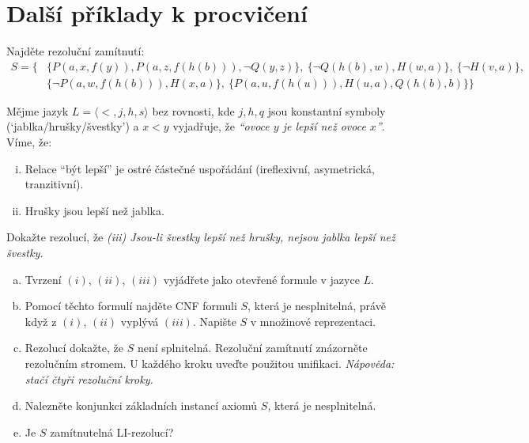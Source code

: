         
\section*{Další příklady k procvičení}


\begin{problem}
    Najděte rezoluční zamítnutí: 
    \begin{align*}
        S=\{
            &\{P(a,x,f(y)),P(a,z,f(h(b))),\neg Q(y,z)\},\
            \{\neg Q(h(b),w),H(w,a)\},\ 
            \{\neg H(v,a)\},\\
            &\{\neg P(a,w,f(h(b))),H(x,a)\},\
            \{P(a,u,f(h(u))),H(u,a),Q(h(b),b)\}            
        \}
    \end{align*}
   

\end{problem}


\begin{problem}

    Mějme jazyk $L=\langle <, j, h, s\rangle$ bez rovnosti, kde $j,h,q$ jsou konstantní symboly (`jablka/hrušky/švestky') a $x < y$ vyjadřuje, že {\it ``ovoce $y$ je lepší než ovoce $x$''}. Víme, že:
    \begin{enumerate}[(i)]\it
        \item Relace ``být lepší'' je ostré částečné uspořádání (ireflexivní, asymetrická, tranzitivní).
        \item Hrušky jsou lepší než jablka.
    \end{enumerate}
    Dokažte rezolucí, že \emph{(iii) Jsou-li švestky lepší než hrušky, nejsou jablka lepší než švestky.}

    \begin{enumerate}[(a)]
    \item Tvrzení $(i)$, $(ii)$, $(iii)$ vyjádřete jako otevřené formule v jazyce $L$.
    \item Pomocí těchto formulí najděte CNF formuli $S$, která je nesplnitelná, právě když z $(i)$, $(ii)$ vyplývá $(iii)$. Napište $S$ v množinové reprezentaci.
    \item Rezolucí dokažte, že $S$ není splnitelná. Rezoluční zamítnutí znázorněte rezolučním stromem. U každého kroku uveďte použitou unifikaci. {\it Nápověda: stačí čtyři rezoluční kroky.}
    \item Nalezněte konjunkci základních instancí axiomů $S$, která je nesplnitelná.
    \item Je $S$ zamítnutelná LI-rezolucí?
    \end{enumerate}

\end{problem}


